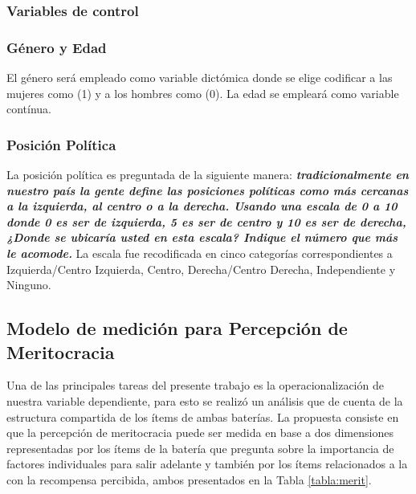 \documentclass[12pt]{article}
\begin{document}
\subsubsection*{Variables de control}

\subsubsection*{Género y Edad}
	
El género será empleado como variable dictómica donde se elige codificar a las mujeres como (1) y a los hombres como (0). La edad se empleará como variable contínua.	
		
\subsubsection*{Posición Política}
	

La posición política es preguntada de la siguiente manera: \textit{\textbf{tradicionalmente en nuestro país la gente define las posiciones políticas como más cercanas a la izquierda, al centro o a la derecha. Usando una escala de 0 a 10 donde 0 es ser de izquierda, 5 es ser de centro y 10 es ser de derecha, ¿Donde se ubicaría usted en esta escala? Indique el número que más le acomode.}} La escala fue recodificada en cinco categorías correspondientes a Izquierda/Centro Izquierda, Centro, Derecha/Centro Derecha, Independiente y Ninguno.
	
\newpage 
	
\subsection{Modelo de medición para Percepción de Meritocracia}
	
Una de las principales tareas del presente trabajo es la operacionalización de nuestra variable dependiente, para esto se realizó un análisis que de cuenta de la estructura compartida de los ítems de ambas baterías. La propuesta consiste en que la percepción de meritocracia puede ser medida en base a dos dimensiones representadas por los ítems de la batería que pregunta sobre la importancia de factores individuales para salir adelante y también por los ítems relacionados a la con la recompensa percibida, ambos presentados en la Tabla \ref{tabla:merit}. 
	
\end{document}
